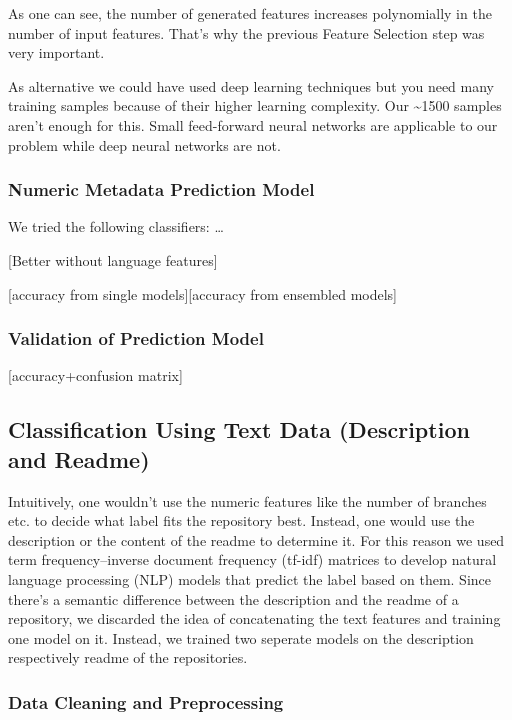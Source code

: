 \documentclass{article}
\begin{document}
As one can see, the number of generated features increases polynomially
in the number of input features. That's why the previous Feature
Selection step was very important.

As alternative we could have used deep learning techniques but you need
many training samples because of their higher learning complexity. Our
\textasciitilde{}1500 samples aren't enough for this. Small feed-forward
neural networks are applicable to our problem while deep neural networks
are not.

\subsubsection{Numeric Metadata Prediction
Model}\label{numeric-metadata-prediction-model}

We tried the following classifiers: \ldots{}

{[}Better without language features{]}

{[}accuracy from single models{]}{[}accuracy from ensembled models{]}

\subsubsection{Validation of Prediction
Model}\label{validation-of-prediction-model}

{[}accuracy+confusion matrix{]}

\subsection{Classification Using Text Data (Description and
Readme)}\label{classification-using-text-data-description-and-readme}

Intuitively, one wouldn't use the numeric features like the number of
branches etc. to decide what label fits the repository best. Instead,
one would use the description or the content of the readme to determine
it. For this reason we used term frequency--inverse document frequency
(tf-idf) matrices to develop natural language processing (NLP) models
that predict the label based on them. Since there's a semantic
difference between the description and the readme of a repository, we
discarded the idea of concatenating the text features and training one
model on it. Instead, we trained two seperate models on the description
respectively readme of the repositories.

\subsubsection{Data Cleaning and
Preprocessing}\label{data-cleaning-and-preprocessing-1}
\end{document}
